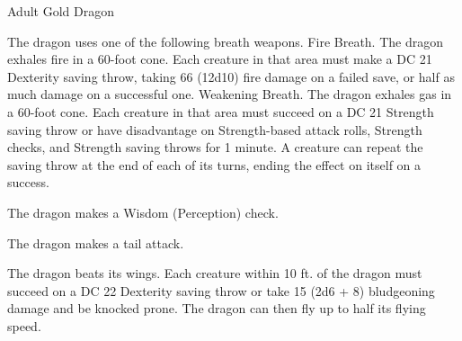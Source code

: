 \begin{monsterbox}{Adult Gold Dragon}
\begin{monsteraction}
\end{monsteraction}
\begin{monsteraction}
The dragon uses one of the following breath weapons.
Fire Breath. The dragon exhales fire in a 60-foot cone. Each creature in that area must make a DC 21 Dexterity saving throw, taking 66 (12d10) fire damage on a failed save, or half as much damage on a successful one.
Weakening Breath. The dragon exhales gas in a 60-foot cone. Each creature in that area must succeed on a DC 21 Strength saving throw or have disadvantage on Strength-based attack rolls, Strength checks, and Strength saving throws for 1 minute. A creature can repeat the saving throw at the end of each of its turns, ending the effect on itself on a success.
\end{monsteraction}
\begin{monsteraction}[Detect]
The dragon makes a Wisdom (Perception) check.
\end{monsteraction}
\begin{monsteraction}
The dragon makes a tail attack.
\end{monsteraction}
\begin{monsteraction}
The dragon beats its wings. Each creature within 10 ft. of the dragon must succeed on a DC 22 Dexterity saving throw or take 15 (2d6 + 8) bludgeoning damage and be knocked prone. The dragon can then fly up to half its flying speed.
\end{monsteraction}
\end{monsterbox}
